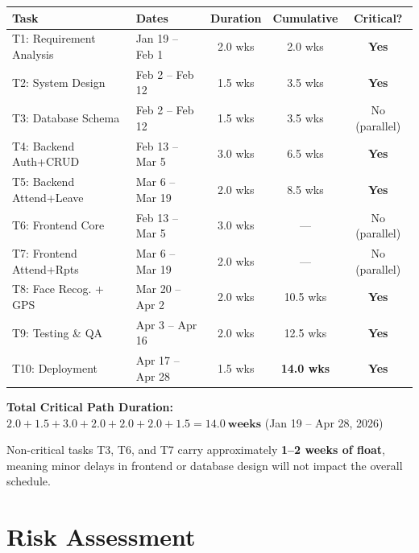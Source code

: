 \documentclass[12pt,a4paper]{article}
\begin{document}
\begin{center}
\begin{tabular}{llccc}
\toprule
\textbf{Task} & \textbf{Dates} & \textbf{Duration} & \textbf{Cumulative} & \textbf{Critical?} \\
\midrule
T1: Requirement Analysis & Jan 19 -- Feb 1 & 2.0 wks & 2.0 wks & \textcolor{critical}{\textbf{Yes}} \\
T2: System Design & Feb 2 -- Feb 12 & 1.5 wks & 3.5 wks & \textcolor{critical}{\textbf{Yes}} \\
T3: Database Schema & Feb 2 -- Feb 12 & 1.5 wks & 3.5 wks & No (parallel) \\
T4: Backend Auth+CRUD & Feb 13 -- Mar 5 & 3.0 wks & 6.5 wks & \textcolor{critical}{\textbf{Yes}} \\
T5: Backend Attend+Leave & Mar 6 -- Mar 19 & 2.0 wks & 8.5 wks & \textcolor{critical}{\textbf{Yes}} \\
T6: Frontend Core & Feb 13 -- Mar 5 & 3.0 wks & --- & No (parallel) \\
T7: Frontend Attend+Rpts & Mar 6 -- Mar 19 & 2.0 wks & --- & No (parallel) \\
T8: Face Recog. + GPS & Mar 20 -- Apr 2 & 2.0 wks & 10.5 wks & \textcolor{critical}{\textbf{Yes}} \\
T9: Testing \& QA & Apr 3 -- Apr 16 & 2.0 wks & 12.5 wks & \textcolor{critical}{\textbf{Yes}} \\
T10: Deployment & Apr 17 -- Apr 28 & 1.5 wks & \textbf{14.0 wks} & \textcolor{critical}{\textbf{Yes}} \\
\bottomrule
\end{tabular}
\end{center}

\noindent\textbf{Total Critical Path Duration:} $2.0 + 1.5 + 3.0 + 2.0 + 2.0 + 2.0 + 1.5 = \mathbf{14.0~weeks}$ (Jan 19 -- Apr 28, 2026)

\medskip
\noindent Non-critical tasks T3, T6, and T7 carry approximately \textbf{1--2 weeks of float}, meaning minor delays in frontend or database design will not impact the overall schedule.

\section{Risk Assessment}
\end{document}

